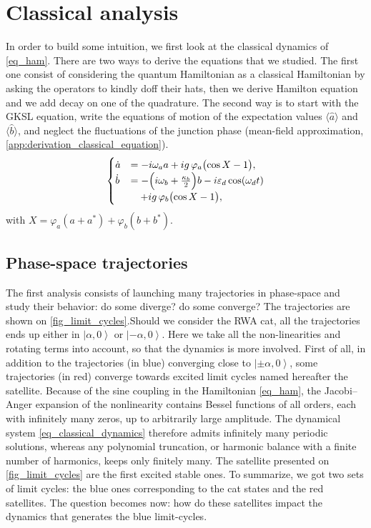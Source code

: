 \documentclass[aps,prx,reprint,floatfix,amsmath,amssymb,longbibliography]{revtex4-2}
\newcommand{\ket}[1]{\left|#1\right\rangle}
\newcommand{\eps}{\varepsilon}
\newcommand{\ha}{\hat{a}}
\newcommand{\hb}{\hat{b}}
\begin{document}
\section{Classical analysis}
\label{sec:classical_analysis}
In order to build some intuition, we first look at the classical dynamics of \cref{eq_ham}. There are two ways to derive the equations that we studied. The first one consist of considering the quantum Hamiltonian as a classical Hamiltonian by asking the operators to kindly doff their hats, then we derive Hamilton equation and we add decay on one of the quadrature.
The second way is to start with the GKSL equation, write the equations of motion of the expectation values $\langle\ha\rangle$ and $\langle\hb\rangle$, and neglect the fluctuations of the junction phase (mean-field approximation, \cref{app:derivation_classical_equation}).
\begin{equation}
    \begin{cases}
        \dot a &= -i\omega_a a+ig\,\varphi_a\bigl(\cos X-1\bigr),\\
        \dot b &= -\Bigl(i\omega_b+\frac{\kappa_b}{2}\Bigr)b-i\eps_d\cos(\omega_d t)\\
        &\quad+ig\,\varphi_b\bigl(\cos X-1\bigr),
    \end{cases}
\label{eq_classical_dynamics}
\end{equation}
with $X=\varphi_a(a+a^*)+\varphi_b(b+b^*)$.

\subsection{Phase-space trajectories}
\label{subsec:phase_space_traj}
The first analysis consists of launching many trajectories in phase-space and study their behavior: do some diverge? do some converge? The trajectories are shown on \cref{fig_limit_cycles}.Should we consider the RWA cat, all the trajectories ends up either in $\ket{\alpha,0}$ or $\ket{-\alpha,0}$. Here we take all the non-linearities and rotating terms into account, so that the dynamics is more involved. First of all, in addition to the trajectories (in blue) converging close to $\ket{\pm\alpha,0}$, some trajectories (in red) converge towards excited limit cycles named hereafter the satellite. Because of the sine coupling in the Hamiltonian \cref{eq_ham}, the Jacobi--Anger expansion of the nonlinearity contains Bessel functions of all orders, each with infinitely many zeros, up to arbitrarily large amplitude. The dynamical system \cref{eq_classical_dynamics} therefore admits infinitely many periodic solutions, whereas any polynomial truncation, or harmonic balance with a finite number of harmonics, keeps only finitely many. The satellite presented on \cref{fig_limit_cycles} are the first excited stable ones. To summarize, we got two sets of limit cycles: the blue ones corresponding to the cat states and the red satellites. The question becomes now: how do these satellites impact the dynamics that generates the blue limit-cycles.
\end{document}
